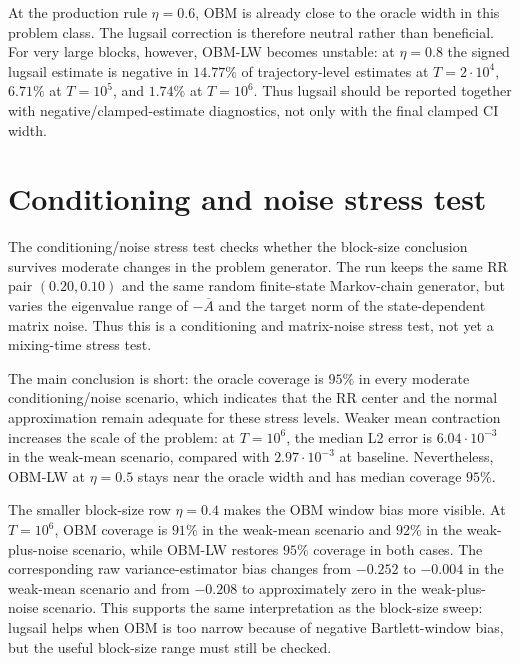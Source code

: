 At the production rule $\eta=0.6$, OBM is already close to the oracle width
in this problem class. The lugsail correction is therefore neutral rather
than beneficial. For very large blocks, however, OBM-LW becomes unstable:
at $\eta=0.8$ the signed lugsail estimate is negative in $14.77\%$ of
trajectory-level estimates at $T=2\cdot10^4$, $6.71\%$ at $T=10^5$, and
$1.74\%$ at $T=10^6$. Thus lugsail should be reported together with
negative/clamped-estimate diagnostics, not only with the final clamped CI
width.

\section{Conditioning and noise stress test}

The conditioning/noise stress test checks whether the block-size conclusion
survives moderate changes in the problem generator. The run keeps the same
RR pair $(0.20,0.10)$ and the same random finite-state Markov-chain generator,
but varies the eigenvalue range of $-\overline A$ and the target norm of the
state-dependent matrix noise. Thus this is a conditioning and matrix-noise
stress test, not yet a mixing-time stress test.

The main conclusion is short: the oracle coverage is $95\%$ in every moderate
conditioning/noise scenario, which indicates that the RR center and the normal
approximation remain adequate for these stress levels. Weaker mean
contraction increases the scale of the problem: at $T=10^6$, the median L2
error is $6.04\cdot10^{-3}$ in the weak-mean scenario, compared with
$2.97\cdot10^{-3}$ at baseline. Nevertheless, OBM-LW at $\eta=0.5$ stays
near the oracle width and has median coverage $95\%$.

The smaller block-size row $\eta=0.4$ makes the OBM window bias more visible.
At $T=10^6$, OBM coverage is $91\%$ in the weak-mean scenario and $92\%$ in
the weak-plus-noise scenario, while OBM-LW restores $95\%$ coverage in both
cases. The corresponding raw variance-estimator bias changes from $-0.252$
to $-0.004$ in the weak-mean scenario and from $-0.208$ to approximately zero
in the weak-plus-noise scenario. This supports the same interpretation as the
block-size sweep: lugsail helps when OBM is too narrow because of negative
Bartlett-window bias, but the useful block-size range must still be checked.

\iffalse

